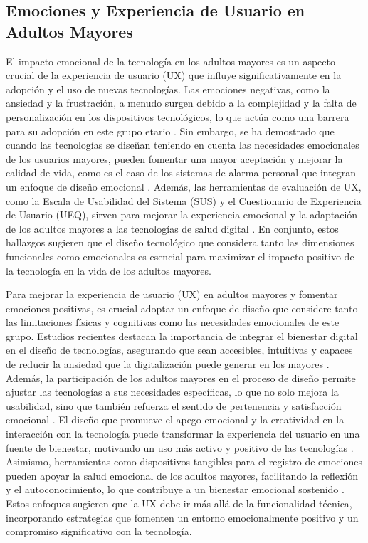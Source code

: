 \subsection{Emociones y Experiencia de Usuario en Adultos Mayores}

El impacto emocional de la tecnología en los adultos mayores es un aspecto crucial de la experiencia de usuario (UX) que influye significativamente en la adopción y el uso de nuevas tecnologías. Las emociones negativas, como la ansiedad y la frustración, a menudo surgen debido a la complejidad y la falta de personalización en los dispositivos tecnológicos, lo que actúa como una barrera para su adopción en este grupo etario \cite{kim_emotional_2012, smith_digital_2021}. Sin embargo, se ha demostrado que cuando las tecnologías se diseñan teniendo en cuenta las necesidades emocionales de los usuarios mayores, pueden fomentar una mayor aceptación y mejorar la calidad de vida, como es el caso de los sistemas de alarma personal que integran un enfoque de diseño emocional \cite{pedell_dont_2015}. Además, las herramientas de evaluación de UX, como la Escala de Usabilidad del Sistema (SUS) y el Cuestionario de Experiencia de Usuario (UEQ), sirven para mejorar la experiencia emocional y la adaptación de los adultos mayores a las tecnologías de salud digital \cite{takano_user_2023}. En conjunto, estos hallazgos sugieren que el diseño tecnológico que considera tanto las dimensiones funcionales como emocionales es esencial para maximizar el impacto positivo de la tecnología en la vida de los adultos mayores.

Para mejorar la experiencia de usuario (UX) en adultos mayores y fomentar emociones positivas, es crucial adoptar un enfoque de diseño que considere tanto las limitaciones físicas y cognitivas como las necesidades emocionales de este grupo. Estudios recientes destacan la importancia de integrar el bienestar digital en el diseño de tecnologías, asegurando que sean accesibles, intuitivas y capaces de reducir la ansiedad que la digitalización puede generar en los mayores \cite{vilpponen_designing_2020}. Además, la participación de los adultos mayores en el proceso de diseño permite ajustar las tecnologías a sus necesidades específicas, lo que no solo mejora la usabilidad, sino que también refuerza el sentido de pertenencia y satisfacción emocional \cite{fischer_importance_2020}. El diseño que promueve el apego emocional y la creatividad en la interacción con la tecnología puede transformar la experiencia del usuario en una fuente de bienestar, motivando un uso más activo y positivo de las tecnologías \cite{lee_creativity_2019}. Asimismo, herramientas como dispositivos tangibles para el registro de emociones pueden apoyar la salud emocional de los adultos mayores, facilitando la reflexión y el autoconocimiento, lo que contribuye a un bienestar emocional sostenido \cite{gooch_designing_2022}. Estos enfoques sugieren que la UX debe ir más allá de la funcionalidad técnica, incorporando estrategias que fomenten un entorno emocionalmente positivo y un compromiso significativo con la tecnología.

